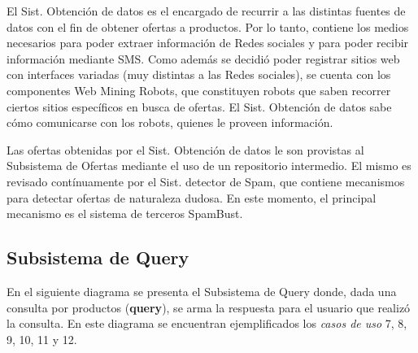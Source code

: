 El \textsf{Sist. Obtención de datos} es el encargado de recurrir a las distintas fuentes de datos con el fin de obtener ofertas a productos. Por lo tanto, contiene los medios necesarios para poder extraer información de \textsf{Redes sociales} y para poder recibir información mediante \textsf{SMS}. Como además se decidió poder registrar sitios web con interfaces variadas (muy distintas a las \textsf{Redes sociales}), se cuenta con los componentes \textsf{Web Mining Robots}, que constituyen robots que saben recorrer ciertos sitios específicos en busca de ofertas. El \textsf{Sist. Obtención de datos} sabe cómo comunicarse con los robots, quienes le proveen información. 

Las ofertas obtenidas por el \textsf{Sist. Obtención de datos} le son provistas al \textsf{Subsistema de Ofertas} mediante el uso de un repositorio intermedio.
El mismo es revisado contínuamente por el \textsf{Sist. detector de Spam}, que contiene mecanismos para detectar ofertas de naturaleza dudosa. En este momento, el principal mecanismo es el sistema de terceros \textsf{SpamBust}.

\subsection{Subsistema de Query}

En el siguiente diagrama se presenta el \textsf{Subsistema de Query} donde, dada una consulta por productos (\textbf{query}), se arma la respuesta para el usuario que realizó la consulta. En este diagrama se encuentran ejemplificados los \emph{casos de uso} 7, 8, 9, 10, 11 y 12.


